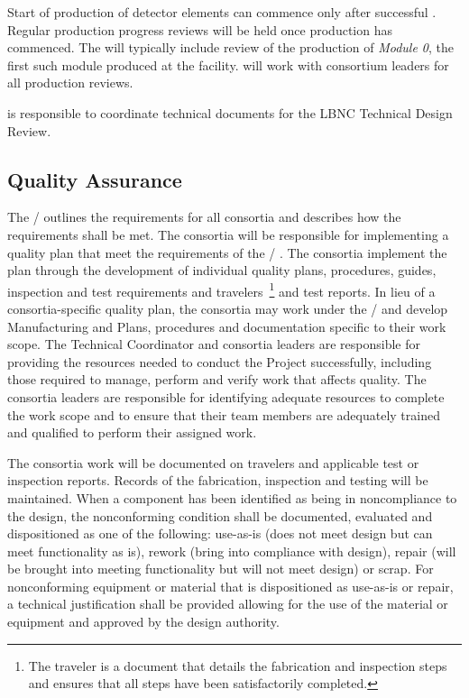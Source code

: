 Start of production of detector elements can commence only after
successful . Regular production progress
reviews will be held once production has commenced. The 
will typically include review of the production of \textit{Module 0}, the
first such module produced at the facility.  will work with
consortium leaders for all production reviews.

 is responsible to coordinate technical documents for the LBNC
Technical Design Review.

\subsection{Quality Assurance}
\label{sec:fdsp-coord-qa}


The /  outlines the  requirements
for all  consortia and describes how the requirements
shall be met. The consortia will be responsible for implementing a
quality plan that meet the requirements of the
/ .  The consortia implement the
plan through the development of individual quality plans, procedures,
guides,  inspection and test requirements and travelers~\footnote{The
  traveler is a document that details the fabrication and inspection
  steps and ensures that all steps have been satisfactorily
  completed.} and test reports.  In lieu of a consortia-specific quality
plan, 
the consortia may work under the /
 and develop Manufacturing and  Plans, procedures and
documentation specific to their work scope.  The Technical Coordinator 
and consortia leaders are responsible for
providing the resources needed to conduct the Project successfully,
including those required to manage, perform and verify work that
affects quality.  The  consortia leaders are responsible
for identifying adequate resources to complete the work scope and to
ensure that their team members are adequately trained and qualified to
perform their assigned work.

The consortia work will be documented on travelers and applicable test
or inspection reports. Records of the fabrication, inspection and
testing will be maintained. When a component has been identified as
being in noncompliance to the design, the nonconforming condition
shall be documented, evaluated and dispositioned as one of the following: use-as-is (does
not meet design but can meet functionality as is), rework (bring into
compliance with design), repair (will be brought into meeting
functionality but will not meet design) or scrap. For nonconforming
equipment or material that is dispositioned as use-as-is or repair, a
technical justification shall be provided allowing for the use of the
material or equipment and approved by the design authority.

